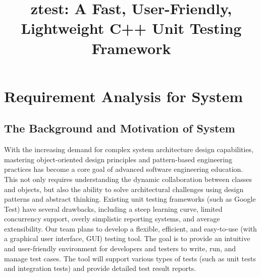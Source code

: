 \documentclass[english]{article}
\title{\textbf{ztest}: A Fast, User-Friendly, Lightweight C++ Unit Testing Framework}
\begin{document}
\maketitle
\tableofcontents  %
\newpage
\section{Requirement Analysis for System}%
\subsection{The Background and Motivation of System}
With the increasing demand for complex system architecture design capabilities, mastering object-oriented design principles and pattern-based engineering practices has become a core goal of advanced software engineering education. This not only requires understanding the dynamic collaboration between classes and objects, but also the ability to solve architectural challenges using design patterns and abstract thinking.
Existing unit testing frameworks (such as Google Test) have several drawbacks, including a steep learning curve, limited concurrency support, overly simplistic reporting systems, and average extensibility. Our team plans to develop a flexible, efficient, and easy-to-use (with a graphical user interface, GUI) testing tool. The goal is to provide an intuitive and user-friendly environment for developers and testers to write, run, and manage test cases. The tool will support various types of tests (such as unit tests and integration tests) and provide detailed test result reports.
\end{document}
